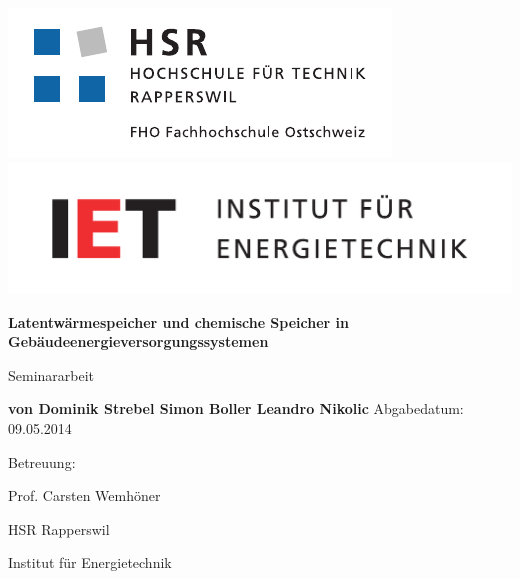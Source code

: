 
\begin{titlepage}
\begin{center}
\includegraphics[scale=0.8]{images/HSR.pdf}
\linebreak \includegraphics[scale=0.3]{images/IET.pdf}
\end{center}

\vspace{2.5cm}
\begin{center}
\textbf{Latentwärmespeicher und chemische Speicher
in Gebäudeenergieversorgungssystemen}
\linebreak
\end{center}
\vspace{1.8cm}
\begin{center}
Seminararbeit
\end{center}
\vspace{1cm}
\begin{center}
\textbf{von \linebreak Dominik Strebel \linebreak Simon Boller \linebreak
Leandro Nikolic} \linebreak
\linebreak 
Abgabedatum: 09.05.2014
\linebreak
\end{center}
\vspace{3cm}
\noindent Betreuung:

\noindent Prof. Carsten Wemhöner

\noindent HSR Rapperswil

\noindent Institut für Energietechnik

\end{titlepage}
\renewcommand{\footrulewidth}{0pt}
\renewcommand{\headrulewidth}{0pt}
\lhead{}
\chead{}
\rhead{}
\cfoot{} 


